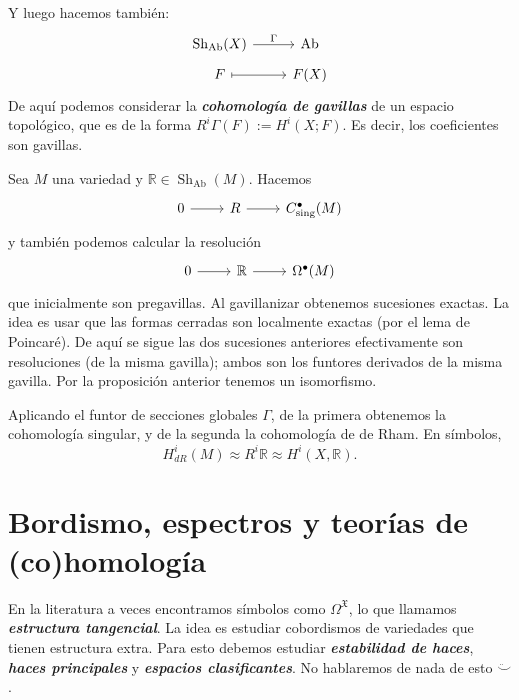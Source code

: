 \documentclass[spanish]{book}
\theoremstyle{definition}
\newcommand{\R}{\mathbb{R}}
\begin{document}
Y luego hacemos también:
\[\begin{tikzcd}[row sep=tiny]
	\operatorname{Sh}_{\operatorname{Ab}}(X)\arrow[r,"\Gamma"]&\operatorname{Ab}\\
	F\arrow[r,maps to]&F(X)
\end{tikzcd}\]
De aquí podemos considerar la \textbf{\textit{cohomología de gavillas}} de un espacio topológico, que es de la forma $R^i\Gamma(F):=H^i(X;F)$. Es decir, los coeficientes son gavillas.

Sea $M$ una variedad y $\R\in\operatorname{Sh}_{\operatorname{Ab}}(M)$. Hacemos
\[\begin{tikzcd}
	0\arrow[r]&R\arrow[r]&C^\bullet_{\operatorname{sing}}(M)
\end{tikzcd}\]
y también podemos calcular la resolución
\[\begin{tikzcd}
	0\arrow[r]&\R\arrow[r]&\Omega^\bullet(M)
\end{tikzcd}\]
que inicialmente son pregavillas. Al gavillanizar obtenemos sucesiones exactas. La idea es usar que las formas cerradas son localmente exactas (por el lema de Poincaré). De aquí se sigue las dos sucesiones anteriores efectivamente son resoluciones (de la misma gavilla); ambos son los funtores derivados de la misma gavilla. Por la proposición anterior tenemos un isomorfismo.

Aplicando el funtor de secciones globales $\Gamma$, de la primera obtenemos la cohomología singular, y de la segunda la cohomología de de Rham. En símbolos,
\[H^i_{dR}(M)\approx R^i\R\approx H^i(X,\R).\]

\section{Bordismo, espectros y teorías de (co)homología}
En la literatura a veces encontramos símbolos como $\Omega^\mathfrak{X}$, lo que llamamos \textbf{\textit{estructura tangencial}}. La idea es estudiar cobordismos de variedades que tienen estructura extra. Para esto debemos estudiar \textbf{\textit{estabilidad de haces}}, \textbf{\textit{haces principales}} y \textbf{\textit{espacios clasificantes}}. No hablaremos de nada de esto $\ddot{\smile}$.
\end{document}
